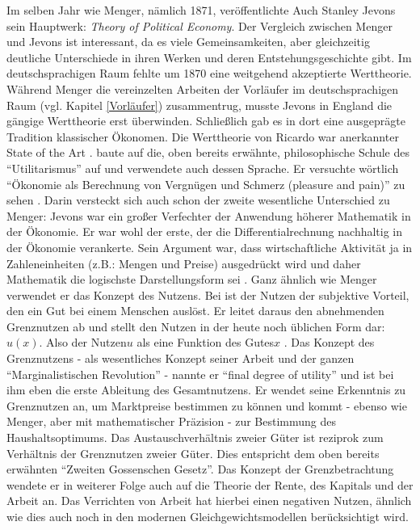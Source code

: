 Im selben Jahr wie Menger, nämlich 1871, veröffentlichte Auch Stanley Jevons sein Hauptwerk: \textit{Theory of Political Economy}. Der Vergleich zwischen Menger und Jevons ist interessant, da es viele Gemeinsamkeiten, aber gleichzeitig deutliche Unterschiede in ihren Werken und deren Entstehungsgeschichte gibt. Im deutschsprachigen Raum fehlte um 1870 eine weitgehend akzeptierte Werttheorie. Während Menger die vereinzelten Arbeiten der Vorläufer im deutschsprachigen Raum (vgl. Kapitel \ref{Vorläufer}) zusammentrug, musste Jevons in England die gängige Werttheorie erst überwinden. Schließlich gab es in dort eine ausgeprägte Tradition klassischer Ökonomen. Die Werttheorie von Ricardo war anerkannter State of the Art \parencite[S. 320]{Rosner2012}. \textcite{Jevons1871} baute auf die, oben bereits erwähnte, philosophische Schule des "`Utilitarismus"' auf und verwendete auch dessen Sprache. Er versuchte wörtlich "`Ökonomie als Berechnung von Vergnügen und Schmerz (pleasure and pain)"' zu sehen \parencite[S. 321]{Rosner2012}. Darin versteckt sich auch schon der zweite wesentliche Unterschied zu Menger: Jevons war ein großer Verfechter der Anwendung höherer Mathematik in der Ökonomie. Er war wohl der erste, der die Differentialrechnung nachhaltig in der Ökonomie verankerte. Sein Argument war, dass wirtschaftliche Aktivität ja in Zahleneinheiten (z.B.: Mengen und Preise) ausgedrückt wird und daher Mathematik die logischste Darstellungsform sei \parencite[S. 71]{Jevons1871}. Ganz ähnlich wie Menger verwendet er das Konzept des Nutzens. Bei \textcite[S. 106]{Jevons1871} ist der Nutzen der subjektive Vorteil, den ein Gut bei einem Menschen auslöst. Er leitet daraus den abnehmenden Grenznutzen ab und stellt den Nutzen in der heute noch üblichen Form dar: $u(x)$. Also der Nutzen$u$ als eine Funktion des Gutes$x$ \parencite{Rosner2012}. Das Konzept des Grenznutzens - als wesentliches Konzept seiner Arbeit und der ganzen "`Marginalistischen Revolution"' - nannte er "`final degree of utility"' und ist bei ihm eben die erste Ableitung des Gesamtnutzens. Er wendet seine Erkenntnis zu Grenznutzen an, um Marktpreise bestimmen zu können und kommt - ebenso wie Menger, aber mit mathematischer Präzision - zur Bestimmung des Haushaltsoptimums. Das Austauschverhältnis zweier Güter ist reziprok zum Verhältnis der Grenznutzen zweier Güter. Dies entspricht dem oben bereits erwähnten "`Zweiten Gossenschen Gesetz"'. Das Konzept der Grenzbetrachtung wendete er in weiterer Folge auch auf die Theorie der Rente, des Kapitals und der Arbeit an. Das Verrichten von Arbeit hat hierbei einen negativen Nutzen, ähnlich wie dies auch noch in den modernen Gleichgewichtsmodellen berücksichtigt wird.

